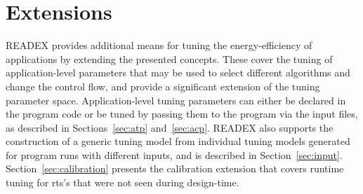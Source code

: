 \section{Extensions} \label{sec:extensions}

READEX provides additional means for tuning the energy-efficiency of applications by extending the presented concepts. These cover the tuning of application-level parameters that may be used to select different algorithms and change the control flow, and provide a significant extension of the tuning parameter space. Application-level tuning parameters can either be declared in the program code or be tuned by passing them to the program via the input files, as described in Sections~\ref{sec:atp} and~\ref{sec:acp}. READEX also supports the construction of a generic tuning model from individual tuning models generated for program runs with different inputs, and is described in Section~\ref{sec:input}. Section~\ref{sec:calibration} presents the calibration extension that covers runtime tuning for rts's that were not seen during design-time. 


